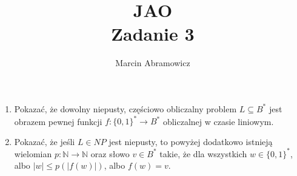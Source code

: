 \documentclass[a4paper]{article}
\title{JAO\\ Zadanie 3}
\author{Marcin Abramowicz}
\newcommand{\N}{\mathbb N}%
\newcommand{\set}[1]{\{#1\}}%
\newcommand{\from}{\colon}%
\renewcommand{\subset}{\subseteq}%
\begin{document}
\maketitle

\begin{enumerate}
  \item 
  Pokazać, że dowolny niepusty, częściowo obliczalny problem $L \subset B^{*}$ jest obrazem pewnej funkcji $f \from \set{0, 1}^{*} \to B^{*}$ obliczalnej w czasie liniowym.

  \item
  Pokazać, że jeśli $L \in NP$ jest niepusty, to powyżej dodatkowo istnieją wielomian $p \from \N \to \N$ oraz słowo $v \in B^{*}$ takie, że dla wszystkich $w \in \set{0,1}^{*}$, albo $|w| \leq p(|f(w)|)$, albo $f(w) = v$.
\end{enumerate}
\end{document}

